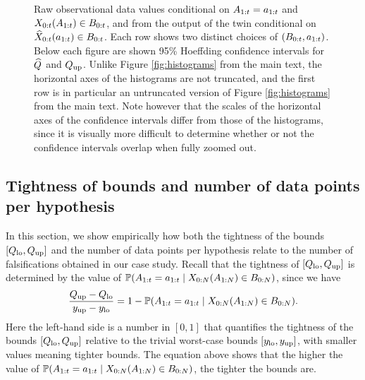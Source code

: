 \begin{figure}[t]
\begin{subfigure}[b]{0.26\textwidth}
    \label{fig:paco2b}
    \end{subfigure}

    \caption{Raw observational data values conditional on $A_{1:t}=a_{1:t}$ and $X_{0:t}(A_{1:t})\in B_{0:t}$, and from the output of the twin conditional on $\widehat{X}_{0:t}(a_{1:t})\in B_{0:t}$.
    Each row shows two distinct choices of $(B_{0:t}, a_{1:t})$.
    Below each figure are shown 95\% Hoeffding confidence intervals for $\widehat{Q}$ and $Q_{\mathrm{up}}$.
    Unlike Figure \ref{fig:histograms} from the main text, the horizontal axes of the histograms are not truncated, and the first row is in particular an untruncated version of Figure \ref{fig:histograms} from the main text.
    Note however that the scales of the horizontal axes of the confidence intervals differ from those of the histograms, since it is visually more difficult to determine whether or not the confidence intervals overlap when fully zoomed out.} \label{fig:histograms-supplement}
\end{figure}

\subsection{Tightness of bounds and number of data points per hypothesis}
    In this section, we show empirically how both the tightness of the bounds $[Q_{\mathrm{lo}}, Q_{\mathrm{up}}]$ and the number of data points per hypothesis relate to the number of falsifications obtained in our case study.
    Recall that the tightness of $[Q_{\mathrm{lo}}, Q_{\mathrm{up}}]$ is determined by the value of $\mathbb{P}(A_{1:t} = a_{1:t} \mid X_{0:N}(A_{1:N}) \in B_{0:N})$, since we have
    \begin{equation} \label{eq:N-propensity-tightness-relation}
        \frac{Q_{\mathrm{up}} - Q_{\mathrm{lo}}}{y_{\mathrm{up}} - y_{\mathrm{lo}}} = 1 - \mathbb{P}(A_{1:t} = a_{1:t} \mid X_{0:N}(A_{1:N}) \in B_{0:N}).
    \end{equation}
    Here the left-hand side is a number in $[0, 1]$ that quantifies the tightness of the bounds $[Q_{\mathrm{lo}}, Q_{\mathrm{up}}]$ relative to the trivial worst-case bounds $[y_{\mathrm{lo}}, y_{\mathrm{up}}]$, with smaller values meaning tighter bounds. The equation above shows that the higher the value of $\mathbb{P}(A_{1:t} = a_{1:t} \mid X_{0:N}(A_{1:N}) \in B_{0:N})$, the tighter the bounds are.
    
